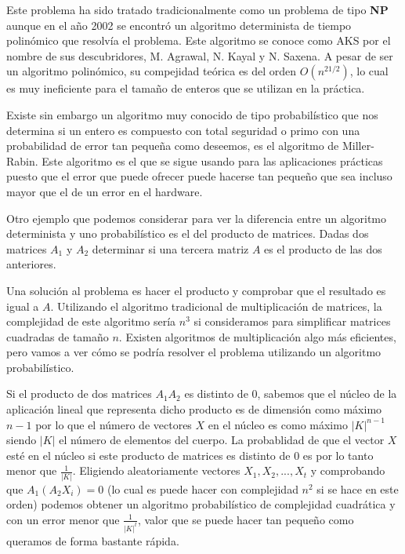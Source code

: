 Este problema ha sido tratado tradicionalmente como un problema de tipo \textbf{NP} aunque en el a\~no 2002 se encontr\'o un algoritmo determinista de tiempo polin\'omico que resolv\'ia el problema. Este algoritmo se conoce como AKS por el nombre de sus descubridores, M. Agrawal, N. Kayal y N. Saxena. A pesar de ser un algoritmo polin\'omico, su compejidad te\'orica es del orden $O(n^{21/2})$, lo cual es muy ineficiente para el tama\~no de enteros que se utilizan en la
pr\'actica.

Existe sin embargo un algoritmo muy conocido de tipo probabil\'istico que nos determina si un entero es compuesto con total seguridad o primo con una probabilidad de error tan peque\~na como deseemos, es el algoritmo de Miller-Rabin. Este algoritmo es el que se sigue usando para las aplicaciones pr\'acticas puesto que el error que puede ofrecer puede hacerse tan peque\~no que sea incluso mayor que el de un error en el hardware.

Otro ejemplo que podemos considerar para ver la diferencia entre un algoritmo determinista y uno probabil\'istico es el del producto de matrices. Dadas dos matrices $A_1$ y $A_2$ determinar si una tercera matriz $A$ es el producto de las dos anteriores.

Una soluci\'on al problema es hacer el producto y comprobar que el resultado es igual a $A$. Utilizando el algoritmo tradicional de multiplicaci\'on de matrices, la complejidad de este algoritmo ser\'ia $n^3$ si consideramos para simplificar matrices cuadradas de tama\~no $n$.  Existen algoritmos de multiplicaci\'on algo m\'as eficientes, pero vamos a ver c\'omo se podr\'ia resolver el problema utilizando un algoritmo probabil\'istico.

Si el producto de dos matrices $A_1 A_2$ es distinto de $0$, sabemos que el n\'ucleo de la aplicaci\'on lineal que representa dicho producto es de dimensi\'on como m\'aximo $n-1$ por lo que el n\'umero de vectores $X$ en el n\'ucleo es como m\'aximo $|K|^{n-1}$ siendo $|K|$ el n\'umero de elementos del cuerpo. La probablidad de que el vector $X$ est\'e en el n\'ucleo si este producto de matrices es distinto de $0$ es por lo tanto menor que $\frac{1}{|K|}$. Eligiendo aleatoriamente vectores $X_1, X_2, ..., X_t$ y comprobando que $A_1 (A_2 X_i)=0$ (lo cual es puede hacer con complejidad $n^2$ si se hace en este orden) podemos obtener un algoritmo probabil\'istico de complejidad cuadr\'atica y con un error menor que $\frac{1}{|K|^t}$, valor que se puede hacer tan peque\~no como queramos de forma bastante r\'apida.
